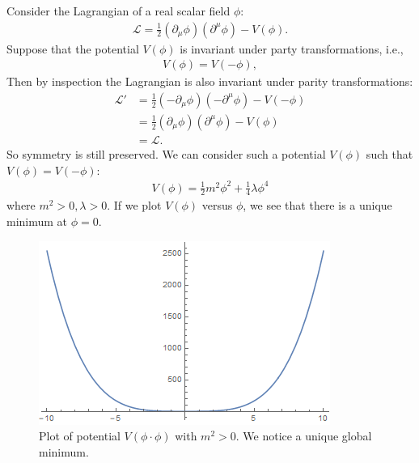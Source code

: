 \documentclass[a4paper,11pt]{article}
\numberwithin{equation}{section}
\theoremstyle{definition}
\newcommand{\p}{\partial}
\newcommand{\lag}{\mathcal{L}}
\begin{document}
Consider the Lagrangian of a real scalar field $\phi$:
\begin{align}
\lag = \frac{1}{2}(\p_\mu\phi)(\p^\mu\phi) - V(\phi).
\end{align}
Suppose that the potential $V(\phi)$ is invariant under party transformations, i.e.,
\begin{align}
V(\phi) = V(-\phi),
\end{align}
Then by inspection the Lagrangian is also invariant under parity transformations:
\begin{align}
\lag' &= \frac{1}{2}(-\p_\mu\phi)(-\p^\mu\phi) - V(-\phi)\\
&= \frac{1}{2}(\p_\mu\phi)(\p^\mu\phi) - V(\phi)\\
&= \lag.
\end{align}
So symmetry is still preserved. We can consider such a potential $V(\phi)$ such that $V(\phi) = V(-\phi)$:
\begin{align}
V(\phi) = \frac{1}{2}m^2\phi^2 + \frac{1}{4}\lambda\phi^4
\end{align}
where $m^2 > 0, \lambda > 0$. If we plot $V(\phi)$ versus $\phi$, we see that there is a unique minimum at $\phi = 0$. 
\begin{figure}[h!]
	\centering
	\includegraphics[scale=1]{curve2.png}
	\caption{Plot of potential $V(\phi\cdot \phi)$ with $m^2 > 0$. We notice a unique global minimum.}
\end{figure}
\end{document}
